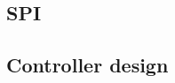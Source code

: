\documentclass[../../main]{subfiles}
\begin{document}
\subsection{SPI}%
\label{sub:spi}



\subsection{Controller design}%
\label{sec:controller_design}




\end{document}
